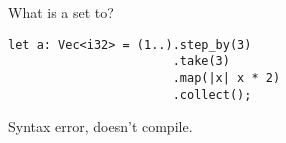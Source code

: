 %
%
What is a set to?

\begin{lstlisting}
let a: Vec<i32> = (1..).step_by(3)
                       .take(3)
                       .map(|x| x * 2)
                       .collect();
\end{lstlisting}

  \choice {[2, 4, 6]}
  \choice Syntax error, doesn't compile.
  \choice {[4, 10, 16]}
  \choice {[2. 8, 14]}
